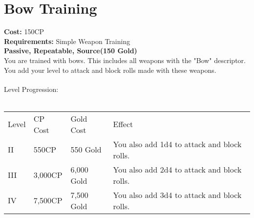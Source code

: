 \section{Bow Training}\label{perk:bowTraining}
\textbf{Cost:} 150CP\\
\textbf{Requirements:} Simple Weapon Training\\
\textbf{Passive, Repeatable, Source(150 Gold)}\\
You are trained with bows.
This includes all weapons with the "Bow" descriptor.
You add your level to attack and block rolls made with these weapons.\\
\\
Level Progression:\\
\\
\begin{tabular}{l | l | l | l}
	Level & CP Cost & Gold Cost & Effect\\
	II & 550CP & 550 Gold & You also add 1d4 to attack and block rolls.\\
	III & 3,000CP & 6,000 Gold & You also add 2d4 to attack and block rolls.\\
	IV & 7,500CP & 7,500 Gold & You also add 3d4 to attack and block rolls.\\
\end{tabular}